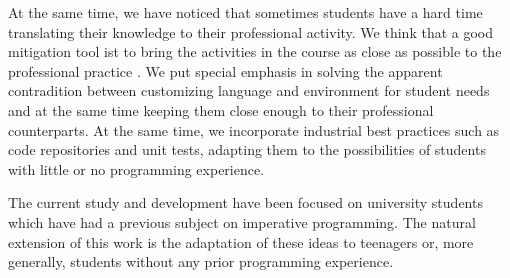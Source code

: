 At the same time, we have noticed that sometimes students
have a hard time translating their knowledge to their professional activity.
We think that a good mitigation tool ist to bring the activities in the course as close as possible to the professional practice \cite{McDermott2017AssessmentAuthenticity}.
We put special emphasis in solving the apparent contradition
between customizing language and environment for student needs
and at the same time keeping them close enough to their professional counterparts.
At the same time, we incorporate industrial best practices 
such as code repositories and unit tests, 
adapting them to the possibilities of students with little or no programming experience.

\medskip


The current study and development have been focused on university students which have had a previous subject on imperative programming.
The natural extension of this work is the adaptation of these ideas to teenagers or, more generally, students without any prior programming experience.

